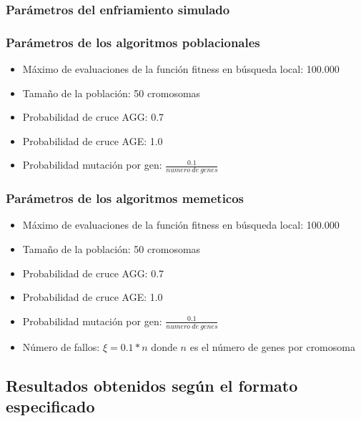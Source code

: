 \documentclass[11pt]{article}
\begin{document}
\subsubsection{Parámetros del enfriamiento simulado} \label{parametros_enfriamiento}

\subsubsection{Parámetros de los algoritmos poblacionales} \label{section:parametros_poblacionales}

\begin{itemize}
    \item Máximo de evaluaciones de la función fitness en búsqueda local: 100.000
    \item Tamaño de la población: 50 cromosomas
    \item Probabilidad de cruce AGG: 0.7
    \item Probabilidad de cruce AGE: 1.0
    \item Probabilidad mutación por gen: $\frac{0.1}{numero\ de\ genes}$
\end{itemize}

\subsubsection{Parámetros de los algoritmos memeticos} \label{section:parametros_memeticos}

\begin{itemize}
    \item Máximo de evaluaciones de la función fitness en búsqueda local: 100.000
    \item Tamaño de la población: 50 cromosomas
    \item Probabilidad de cruce AGG: 0.7
    \item Probabilidad de cruce AGE: 1.0
    \item Probabilidad mutación por gen: $\frac{0.1}{numero\ de\ genes}$
    \item Número de fallos: $\xi = 0.1 * n$ donde $n$ es el número de genes por cromosoma
\end{itemize}


\pagebreak

\subsection{Resultados obtenidos según el formato especificado}
\end{document}
